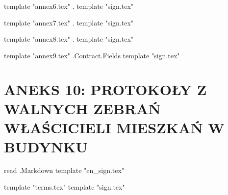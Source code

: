 {{template "annex6.tex" .}} %
{{template "sign.tex"}} %

{{template "annex7.tex" .}} %
{{template "sign.tex"}} %

{{template "annex8.tex" .}} %
{{template "sign.tex"}} %

{{template "annex9.tex" .Contract.Fields}} %
{{template "sign.tex"}} %

\pagebreak
\section{ANEKS 10: PROTOKOŁY Z WALNYCH ZEBRAŃ WŁAŚCICIELI MIESZKAŃ W BUDYNKU}
{{read .Markdown}} %
{{template "en_sign.tex"}} %
\FloatBarrier{}\mbox{}\vfill\pagebreak %

{{template "terms.tex"}} %
{{template "sign.tex"}} %

